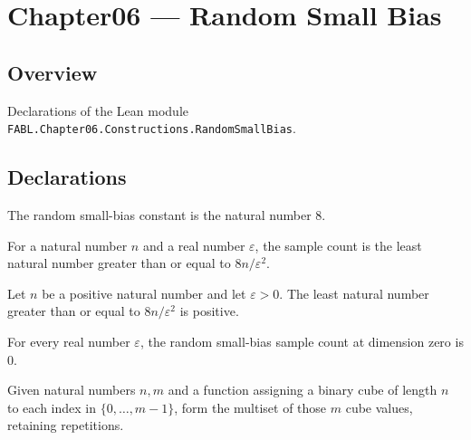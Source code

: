 \chapter{Chapter06 — Random Small Bias}
\section{Overview}

Declarations of the Lean module \texttt{FABL.Chapter06.Constructions.RandomSmallBias}.

\section{Declarations}

\begin{definition}
\label{FABL.randomSmallBiasConstant}
\leanok
The random small-bias constant is the natural number $8$.
\end{definition}

\begin{definition}
\label{FABL.randomSmallBiasSampleCount}
\leanok
{}
For a natural number $n$ and a real number $\varepsilon$, the sample count is the least
natural number greater than or equal to $8n/\varepsilon^2$.
\end{definition}

\begin{theorem}
\label{FABL.randomSmallBiasSampleCount_pos}
\leanok
{}
Let $n$ be a positive natural number and let $\varepsilon>0$. The least natural number
greater than or equal to $8n/\varepsilon^2$ is positive.
\end{theorem}

\begin{theorem}
\label{FABL.randomSmallBiasSampleCount_zero}
\leanok
{}
For every real number $\varepsilon$, the random small-bias sample count at dimension
zero is $0$.
\end{theorem}

\begin{definition}
\label{FABL.randomSmallBiasMultiset}
\leanok
{}
Given natural numbers $n,m$ and a function assigning a binary cube of length $n$ to each
index in $\{0,\ldots,m-1\}$, form the multiset of those $m$ cube values, retaining
repetitions.
\end{definition}

